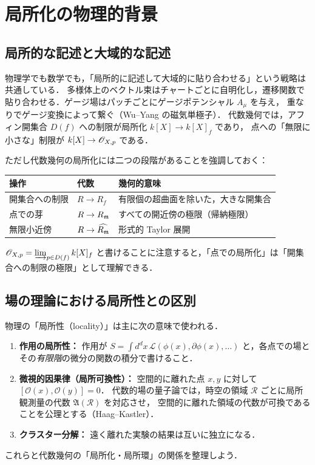 \section{局所化の物理的背景}
\label{sec:ch06-phys}

\subsection{局所的な記述と大域的な記述}

物理学でも数学でも，「局所的に記述して大域的に貼り合わせる」という戦略は共通している．
多様体上のベクトル束はチャートごとに自明化し，遷移関数で貼り合わせる．ゲージ場はパッチごとにゲージポテンシャル $A_\mu$ を与え，
重なりでゲージ変換によって繋ぐ（Wu--Yang の磁気単極子）．
代数幾何では，アフィン開集合 $D(f)$ への制限が局所化 $k[X]\to k[X]_f$ であり，
点への「無限に小さな」制限が $k[X]\to\mathscr{O}_{X,p}$ である．

ただし代数幾何の局所化には二つの段階があることを強調しておく：
\begin{center}
\renewcommand{\arraystretch}{1.3}
\begin{tabular}{l|l|l}
操作 & 代数 & 幾何的意味\\ \hline
開集合への制限 & $R\to R_f$ & 有限個の超曲面を除いた，大きな開集合\\
点での芽 & $R\to R_{\mathfrak{m}}$ & すべての開近傍の極限（帰納極限）\\
無限小近傍 & $R\to\widehat{R_{\mathfrak{m}}}$ & 形式的 Taylor 展開
\end{tabular}
\end{center}
$\mathscr{O}_{X,p}=\varinjlim_{p\in D(f)}k[X]_f$ と書けることに注意すると，「点での局所化」は「開集合への制限の極限」として理解できる．

\subsection{場の理論における局所性との区別}

物理の「局所性（locality）」は主に次の意味で使われる．
\begin{enumerate}
  \item \textbf{作用の局所性：} 作用が $S=\int d^dx\,\mathcal L(\phi(x),\partial\phi(x),\dots)$ と，各点での場とその\emph{有限階}の微分の関数の積分で書けること．
  \item \textbf{微視的因果律（局所可換性）：} 空間的に離れた点 $x,y$ に対して $[\mathcal O(x),\mathcal O(y)]=0$．
        代数的場の量子論では，時空の領域 $\mathcal R$ ごとに局所観測量の代数 $\mathfrak A(\mathcal R)$ を対応させ，
        空間的に離れた領域の代数が可換であることを公理とする（Haag--Kastler）．
  \item \textbf{クラスター分解：} 遠く離れた実験の結果は互いに独立になる．
\end{enumerate}
これらと代数幾何の「局所化・局所環」の関係を整理しよう．

